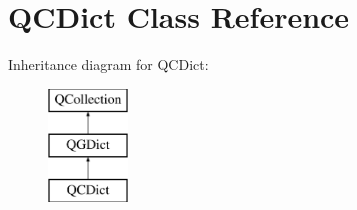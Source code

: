 \hypertarget{class_q_c_dict}{}\section{Q\+C\+Dict Class Reference}
\label{class_q_c_dict}
Inheritance diagram for Q\+C\+Dict\+:\begin{figure}[H]
\begin{center}
\leavevmode
\includegraphics[height=3.000000cm]{class_q_c_dict}
\end{center}
\end{figure}
